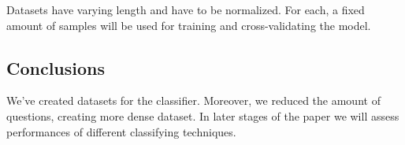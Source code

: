 \documentclass[11pt]{article}
\begin{document}
Datasets have varying length and have to be normalized. For each, a
fixed amount of samples will be used for training and cross-validating
the model.

\subsection{Conclusions}\label{conclusions}

We've created datasets for the classifier. Moreover, we reduced the
amount of questions, creating more dense dataset. In later stages of the
paper we will assess performances of different classifying techniques.


    
    
    
    
\end{document}
